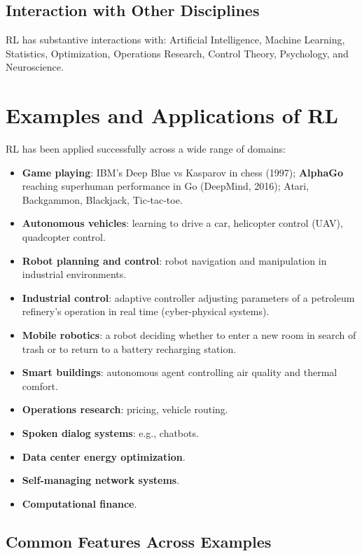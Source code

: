 \documentclass[11pt,a4paper]{article}
\theoremstyle{definition}
\theoremstyle{plain}
\theoremstyle{remark}
\begin{document}
\subsection{Interaction with Other Disciplines}

RL has substantive interactions with: Artificial Intelligence, Machine Learning, Statistics, Optimization, Operations Research, Control Theory, Psychology, and Neuroscience.


\section{Examples and Applications of RL}

RL has been applied successfully across a wide range of domains:

\begin{itemize}
    \item \textbf{Game playing}: IBM's Deep Blue vs Kasparov in chess (1997); \textbf{AlphaGo} reaching superhuman performance in Go (DeepMind, 2016); Atari, Backgammon, Blackjack, Tic-tac-toe.
    \item \textbf{Autonomous vehicles}: learning to drive a car, helicopter control (UAV), quadcopter control.
    \item \textbf{Robot planning and control}: robot navigation and manipulation in industrial environments.
    \item \textbf{Industrial control}: adaptive controller adjusting parameters of a petroleum refinery's operation in real time (cyber-physical systems).
    \item \textbf{Mobile robotics}: a robot deciding whether to enter a new room in search of trash or to return to a battery recharging station.
    \item \textbf{Smart buildings}: autonomous agent controlling air quality and thermal comfort.
    \item \textbf{Operations research}: pricing, vehicle routing.
    \item \textbf{Spoken dialog systems}: e.g., chatbots.
    \item \textbf{Data center energy optimization}.
    \item \textbf{Self-managing network systems}.
    \item \textbf{Computational finance}.
\end{itemize}

\subsection{Common Features Across Examples}
\end{document}
